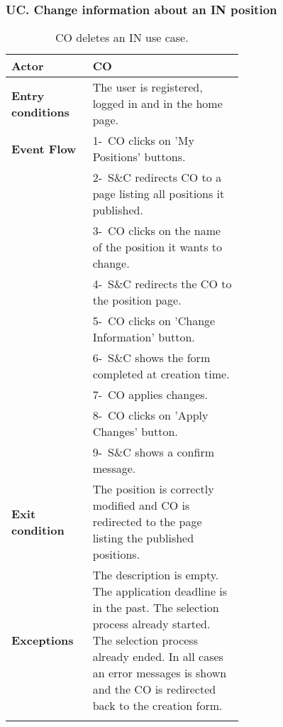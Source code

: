 \subsubsection*{UC\cuc . Change information about an IN position}
\begin{center}
    \begin{longtable}{|l|p{0.65\linewidth}|}
        \hline
        \textbf{Actor}            & CO \\
        \hline
        \textbf{Entry conditions} & The user is registered, logged in and in the home page.\\
        \hline
        \textbf{Event Flow}       & 1-\ CO clicks on 'My Positions' buttons. \\
        & 2-\ S\&C redirects CO to a page listing all positions it published. \\
        & 3-\ CO clicks on the name of the position it wants to change. \\
        & 4-\ S\&C redirects the CO to the position page.\\
        & 5-\ CO clicks on 'Change Information' button. \\
        & 6-\ S\&C shows the form completed at creation time. \\
        & 7-\ CO applies changes. \\
        & 8-\ CO clicks on 'Apply Changes' button. \\
        & 9-\ S\&C shows a confirm message. \\
        \hline
        \textbf{Exit condition}   &  The position is correctly modified and CO is redirected to the page listing the published positions. \\
        \hline
        \textbf{Exceptions}       & The description is empty. The application deadline is in the past. The selection process already started. The selection process already ended. In all cases an error messages is shown and the CO is redirected back to the creation form. \\
        \hline
        \caption{CO deletes an IN use case.}
        \label{tab: cp_use_case}
    \end{longtable}
\end{center}

